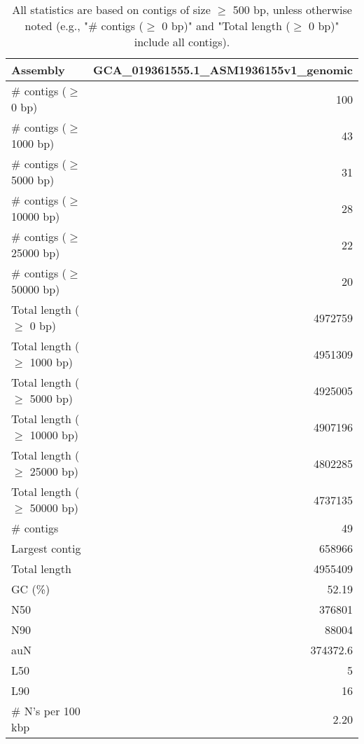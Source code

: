 \documentclass[12pt,a4paper]{article}
\begin{document}
\begin{table}[ht]
\begin{center}
\caption{All statistics are based on contigs of size $\geq$ 500 bp, unless otherwise noted (e.g., "\# contigs ($\geq$ 0 bp)" and "Total length ($\geq$ 0 bp)" include all contigs).}
\begin{tabular}{|l*{1}{|r}|}
\hline
Assembly & GCA\_019361555.1\_ASM1936155v1\_genomic \\ \hline
\# contigs ($\geq$ 0 bp) & 100 \\ \hline
\# contigs ($\geq$ 1000 bp) & 43 \\ \hline
\# contigs ($\geq$ 5000 bp) & 31 \\ \hline
\# contigs ($\geq$ 10000 bp) & 28 \\ \hline
\# contigs ($\geq$ 25000 bp) & 22 \\ \hline
\# contigs ($\geq$ 50000 bp) & 20 \\ \hline
Total length ($\geq$ 0 bp) & 4972759 \\ \hline
Total length ($\geq$ 1000 bp) & 4951309 \\ \hline
Total length ($\geq$ 5000 bp) & 4925005 \\ \hline
Total length ($\geq$ 10000 bp) & 4907196 \\ \hline
Total length ($\geq$ 25000 bp) & 4802285 \\ \hline
Total length ($\geq$ 50000 bp) & 4737135 \\ \hline
\# contigs & 49 \\ \hline
Largest contig & 658966 \\ \hline
Total length & 4955409 \\ \hline
GC (\%) & 52.19 \\ \hline
N50 & 376801 \\ \hline
N90 & 88004 \\ \hline
auN & 374372.6 \\ \hline
L50 & 5 \\ \hline
L90 & 16 \\ \hline
\# N's per 100 kbp & 2.20 \\ \hline
\end{tabular}
\end{center}
\end{table}
\end{document}
